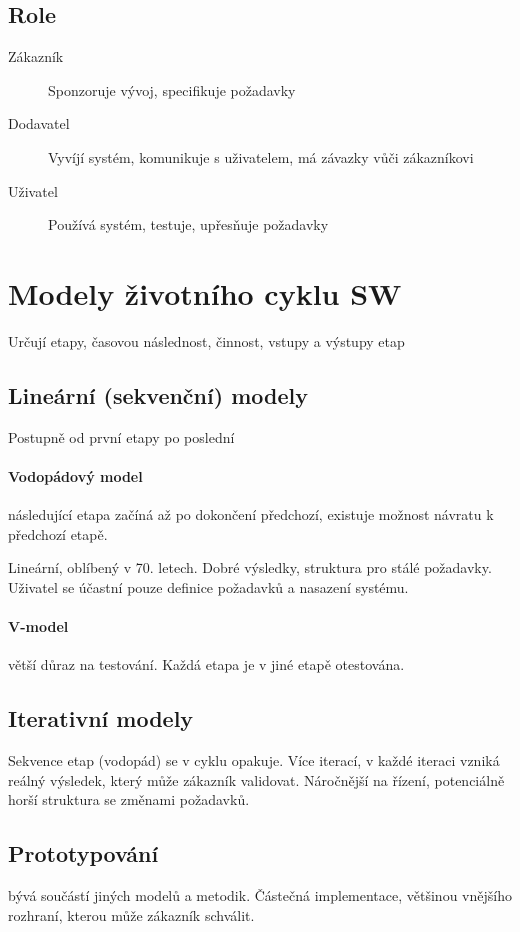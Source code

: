 \documentclass[a4paper, 11pt]{report}
\begin{document}
\subsection{Role}
\begin{description}
	\item[Zákazník] Sponzoruje vývoj, specifikuje požadavky
	\item[Dodavatel] Vyvíjí systém, komunikuje s uživatelem, má závazky vůči zákazníkovi
	\item[Uživatel] Používá systém, testuje, upřesňuje požadavky
\end{description}

\section{Modely životního cyklu SW}
Určují etapy, časovou následnost, činnost, vstupy a výstupy etap

\subsection{Lineární (sekvenční) modely} Postupně od první etapy po poslední

\paragraph{Vodopádový model} následující etapa začíná až po dokončení předchozí, existuje možnost návratu k předchozí etapě.

Lineární, oblíbený v 70. letech. Dobré výsledky, struktura pro stálé požadavky. Uživatel se účastní pouze definice požadavků a nasazení systému.

\paragraph{V-model} větší důraz na testování. Každá etapa je v jiné etapě otestována.

\subsection{Iterativní modely}
Sekvence etap (vodopád) se v cyklu opakuje. Více iterací, v každé iteraci vzniká reálný výsledek, který může zákazník validovat. Náročnější na řízení, potenciálně horší struktura se změnami požadavků.

\subsection{Prototypování} bývá součástí jiných modelů a metodik. Částečná implementace, většinou vnějšího rozhraní, kterou může zákazník schválit.
\end{document}
